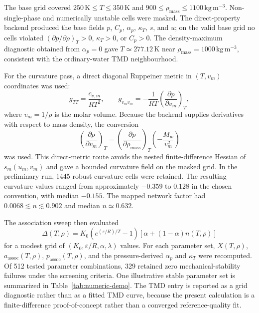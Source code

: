 \documentclass[12pt]{article}
\begin{document}
The base grid covered $250\,\mathrm{K}\le T\le 350\,\mathrm{K}$ and $900\le\rho_{\mathrm{mass}}\le1100\,\mathrm{kg\,m^{-3}}$. Non-single-phase and numerically unstable cells were masked. The direct-property backend produced the base fields $p$, $C_p$, $\alpha_p$, $\kappa_T$, $s$, and $u$; on the valid base grid no cells violated $(\partial p/\partial\rho)_T>0$, $\kappa_T>0$, or $C_p>0$. The density-maximum diagnostic obtained from $\alpha_p=0$ gave $T\simeq277.12\,\mathrm{K}$ near $\rho_{\mathrm{mass}}=1000\,\mathrm{kg\,m^{-3}}$, consistent with the ordinary-water TMD neighbourhood.

For the curvature pass, a direct diagonal Ruppeiner metric in $(T,v_m)$ coordinates was used:
\begin{equation}
  g_{TT}=\frac{c_{v,m}}{RT^2},
  \qquad
  g_{v_m v_m}=-\frac{1}{RT}\left(\frac{\partial p}{\partial v_m}\right)_T,
\end{equation}
where $v_m=1/\rho$ is the molar volume. Because the backend supplies derivatives with respect to mass density, the conversion
\begin{equation}
  \left(\frac{\partial p}{\partial v_m}\right)_T
  =\left(\frac{\partial p}{\partial\rho_{\mathrm{mass}}}\right)_T
  \left(-\frac{M_w}{v_m^2}\right)
\end{equation}
was used. This direct-metric route avoids the nested finite-difference Hessian of $s_m(u_m,v_m)$ and gave a bounded curvature field on the masked grid. In the preliminary run, 1445 robust curvature cells were retained. The resulting curvature values ranged from approximately $-0.359$ to $0.128$ in the chosen convention, with median $-0.155$. The mapped network factor had $0.0068\lesssim n\lesssim0.902$ and median $n\simeq0.632$.

The association sweep then evaluated
\begin{equation}
  \Delta(T,\rho)=K_0\left(e^{(\varepsilon/R)/T}-1\right)
  \left[\alpha+(1-\alpha)n(T,\rho)\right]
\end{equation}
for a modest grid of $(K_0,\varepsilon/R,\alpha,\lambda)$ values. For each parameter set, $X(T,\rho)$, $a_{\mathrm{assoc}}(T,\rho)$, $p_{\mathrm{assoc}}(T,\rho)$, and the pressure-derived $\alpha_p$ and $\kappa_T$ were recomputed. Of 512 tested parameter combinations, 329 retained zero mechanical-stability failures under the screening criteria. One illustrative stable parameter set is summarized in Table~\ref{tab:numeric-demo}. The TMD entry is reported as a grid diagnostic rather than as a fitted TMD curve, because the present calculation is a finite-difference proof-of-concept rather than a converged reference-quality fit.
\end{document}
